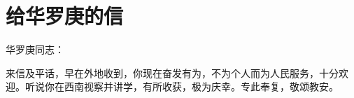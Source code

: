 \section[给华罗庚的信（一九六五年七月二十一日）]{给华罗庚的信}


\noindent 华罗庚同志：

来信及平话，早在外地收到，你现在奋发有为，不为个人而为人民服务，十分欢迎。听说你在西南视察并讲学，有所收获，极为庆幸。专此奉复，敬颂教安。

